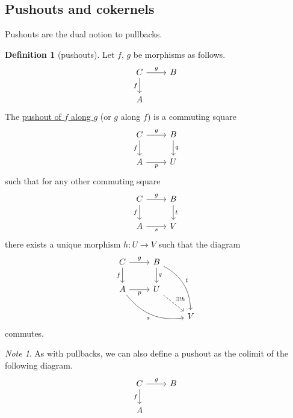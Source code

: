 \documentclass[a4paper,10pt]{scrreprt}
\newcommand{\defn}[1]{\ul{#1}}
\theoremstyle{definition}
\newtheorem{definition}{Definition}[section]
\theoremstyle{plain}
\theoremstyle{remark}
\newtheorem{note}{Note}[section]
\begin{document}
\subsection{Pushouts and cokernels}
Pushouts are the dual notion to pullbacks.
\begin{definition}[pushouts]
  \label{def:pushout}
  Let $f$, $g$ be morphisms as follows.
  \begin{equation*}
    \begin{tikzcd}
      C \arrow[r, "g"] \arrow[d, swap, "f"] & B \\
      A
    \end{tikzcd}
  \end{equation*}
  The \defn{pushout of $f$ along $g$} (or $g$ along $f$) is a commuting square
  \begin{equation*}
    \begin{tikzcd}
      C \arrow[r, "g"] \arrow[d, swap, "f"] & B \arrow[d, "q"] \\
      A \arrow[r, swap, "p"] & U
    \end{tikzcd}
  \end{equation*}
  such that for any other commuting square
  \begin{equation*}
    \begin{tikzcd}
      C \arrow[r, "g"] \arrow[d, swap, "f"] & B \arrow[d, "t"] \\
      A \arrow[r, swap, "s"] & V
    \end{tikzcd}
  \end{equation*}
  there exists a unique morphism $h\colon U \to V$ such that the diagram 
  \begin{equation*}
    \begin{tikzcd}
      C \arrow[r, "g"] \arrow[d, swap, "f"] & B \arrow[d, "q"] \arrow[ddr, bend left, "t"] & \\
      A \arrow[drr, bend right, swap, "s"] \arrow[r, swap, "p"] & U \arrow[dr, dashed, "\exists!h"] & \\
      & & V
    \end{tikzcd}
  \end{equation*}
  commutes.
\end{definition}

\begin{note}
  As with pullbacks, we can also define a pushout as the colimit of the following diagram.
  \begin{equation*}
    \begin{tikzcd}
      C \arrow[r, "g"] \arrow[d, swap, "f"] & B \\
      A
    \end{tikzcd}
  \end{equation*}
\end{note}
\end{document}
